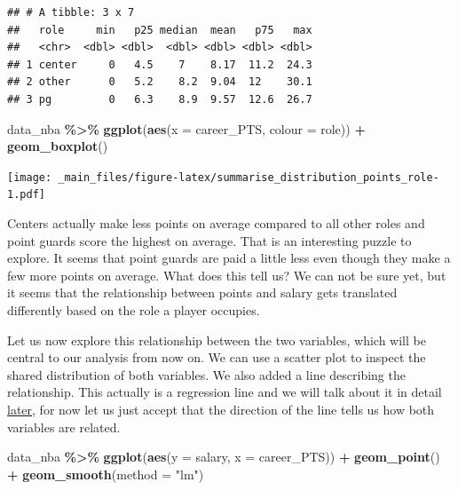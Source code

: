\documentclass[
]{book}
\newenvironment{Shaded}{\begin{snugshade}}{\end{snugshade}}
\newcommand{\AttributeTok}[1]{\textcolor[rgb]{0.13,0.29,0.53}{#1}}
\newcommand{\FunctionTok}[1]{\textcolor[rgb]{0.13,0.29,0.53}{\textbf{#1}}}
\newcommand{\NormalTok}[1]{#1}
\newcommand{\SpecialCharTok}[1]{\textcolor[rgb]{0.81,0.36,0.00}{\textbf{#1}}}
\newcommand{\StringTok}[1]{\textcolor[rgb]{0.31,0.60,0.02}{#1}}
\begin{document}
\begin{verbatim}
## # A tibble: 3 x 7
##   role     min   p25 median  mean   p75   max
##   <chr>  <dbl> <dbl>  <dbl> <dbl> <dbl> <dbl>
## 1 center     0   4.5    7    8.17  11.2  24.3
## 2 other      0   5.2    8.2  9.04  12    30.1
## 3 pg         0   6.3    8.9  9.57  12.6  26.7
\end{verbatim}

\begin{Shaded}
\begin{Highlighting}[]
\NormalTok{data\_nba }\SpecialCharTok{\%\textgreater{}\%}
  \FunctionTok{ggplot}\NormalTok{(}\FunctionTok{aes}\NormalTok{(}\AttributeTok{x =}\NormalTok{ career\_PTS, }\AttributeTok{colour =}\NormalTok{ role)) }\SpecialCharTok{+}
  \FunctionTok{geom\_boxplot}\NormalTok{()}
\end{Highlighting}
\end{Shaded}

\texttt{[image: \_main\_files/figure-latex/summarise\_distribution\_points\_role-1.pdf]}

Centers actually make less points on average compared to all other roles and point guards score the highest on average. That is an interesting puzzle to explore. It seems that point guards are paid a little less even though they make a few more points on average. What does this tell us? We can not be sure yet, but it seems that the relationship between points and salary gets translated differently based on the role a player occupies.

Let us now explore this relationship between the two variables, which will be central to our analysis from now on. We can use a scatter plot to inspect the shared distribution of both variables. We also added a line describing the relationship. This actually is a regression line and we will talk about it in detail \protect\hyperlink{lin-t-1}{later}, for now let us just accept that the direction of the line tells us how both variables are related.

\begin{Shaded}
\begin{Highlighting}[]
\NormalTok{data\_nba }\SpecialCharTok{\%\textgreater{}\%} 
  \FunctionTok{ggplot}\NormalTok{(}\FunctionTok{aes}\NormalTok{(}\AttributeTok{y =}\NormalTok{ salary, }\AttributeTok{x =}\NormalTok{ career\_PTS)) }\SpecialCharTok{+}
  \FunctionTok{geom\_point}\NormalTok{() }\SpecialCharTok{+}
  \FunctionTok{geom\_smooth}\NormalTok{(}\AttributeTok{method =} \StringTok{"lm"}\NormalTok{)}
\end{Highlighting}
\end{Shaded}
\end{document}
